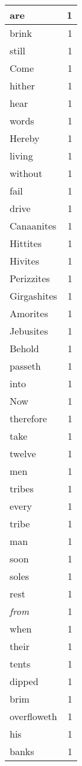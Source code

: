 \begin{center}
\begin{longtable}{l|r}
are & 1 \\ \hline
brink & 1 \\ \hline
still & 1 \\ \hline
Come & 1 \\ \hline
hither & 1 \\ \hline
hear & 1 \\ \hline
words & 1 \\ \hline
Hereby & 1 \\ \hline
living & 1 \\ \hline
without & 1 \\ \hline
fail & 1 \\ \hline
drive & 1 \\ \hline
Canaanites & 1 \\ \hline
Hittites & 1 \\ \hline
Hivites & 1 \\ \hline
Perizzites & 1 \\ \hline
Girgashites & 1 \\ \hline
Amorites & 1 \\ \hline
Jebusites & 1 \\ \hline
Behold & 1 \\ \hline
passeth & 1 \\ \hline
into & 1 \\ \hline
Now & 1 \\ \hline
therefore & 1 \\ \hline
take & 1 \\ \hline
twelve & 1 \\ \hline
men & 1 \\ \hline
tribes & 1 \\ \hline
every & 1 \\ \hline
tribe & 1 \\ \hline
man & 1 \\ \hline
soon & 1 \\ \hline
soles & 1 \\ \hline
rest & 1 \\ \hline
\emph{from} & 1 \\ \hline
when & 1 \\ \hline
their & 1 \\ \hline
tents & 1 \\ \hline
dipped & 1 \\ \hline
brim & 1 \\ \hline
overfloweth & 1 \\ \hline
his & 1 \\ \hline
banks & 1 \\ \hline

\end{longtable}
\end{center}
